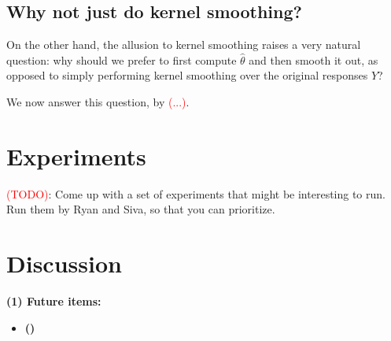 \documentclass{article}
\newcommand{\1}{\mathbf{1}}
\newcommand{\wh}[1]{\widehat{#1}}
\theoremstyle{alden}
\theoremstyle{aldenthm}
\theoremstyle{definition}
\theoremstyle{remark}
\begin{document}
\subsection{Why not just do kernel smoothing?}
On the other hand, the allusion to kernel smoothing raises a very natural question: why should we prefer to first compute $\wh{\theta}$ and then smooth it out, as opposed to simply performing kernel smoothing over the original responses $Y$?

We now answer this question, by \textcolor{red}{(...)}.

\section{Experiments}
\label{sec:experiments}

\textcolor{red}{(TODO)}: Come up with a set of experiments that might be interesting to run. Run them by Ryan and Siva, so that you can prioritize.

\section{Discussion}
\label{sec:discussion}

\textbf{(1) Future items:}
\begin{itemize}
	\item \textbf{()}
\end{itemize}



 
\end{document}

